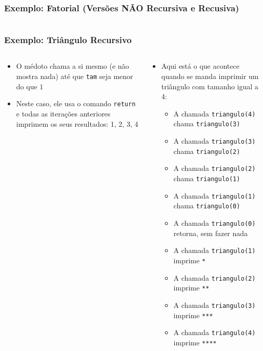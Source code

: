\documentclass[xcolor={dvipsnames,table},aspectratio=169]{beamer}
\begin{document}
\begin{frame}[fragile]\frametitle{Exemplo: Fatorial (Versões NÃO Recursiva e Recusiva)}
\pause
{\scriptsize\inputminted[bgcolor=cyan!10]{java}{src/Fatorial.java}}	
\end{frame}

\begin{frame}[fragile]\frametitle{Exemplo: Triângulo Recursivo}
\begin{columns}[T]
	\begin{column}{0.5\linewidth}
\begin{itemize}
    \scriptsize
	\item O médoto chama a si mesmo (e não mostra nada) até que \texttt{tam} seja menor do que $1$
	\item Neste caso, ele usa o comando \texttt{return} e todas as iterações anteriores imprimem os seus resultados: 1, 2, 3, 4
\tiny{\inputminted[bgcolor=cyan!10]{java}{src/Triangulo.java}}
	\end{itemize}
	\end{column}
	\begin{column}{0.5\linewidth}
{\scriptsize
\begin{itemize}
    \scriptsize
    \item Aqui está o que acontece quando se manda imprimir um triângulo com tamanho igual a 4:
    \begin{itemize}
    \scriptsize
	\item A chamada \texttt{triangulo(4)} chama \texttt{triangulo(3)}
	\item A chamada \texttt{triangulo(3)} chama \texttt{triangulo(2)}
	\item A chamada \texttt{triangulo(2)} chama \texttt{triangulo(1)}
	\item A chamada \texttt{triangulo(1)} chama \texttt{triangulo(0)}
	\item A chamada \texttt{triangulo(0)} retorna, sem fazer nada
	\item A chamada \texttt{triangulo(1)} imprime \texttt{*}
	\item A chamada \texttt{triangulo(2)} imprime \texttt{**}
	\item A chamada \texttt{triangulo(3)} imprime \texttt{***}
	\item A chamada \texttt{triangulo(4)} imprime \texttt{****}
    \end{itemize}
\end{itemize}
}
	\end{column}
\end{columns}
\end{frame}
\end{document}
